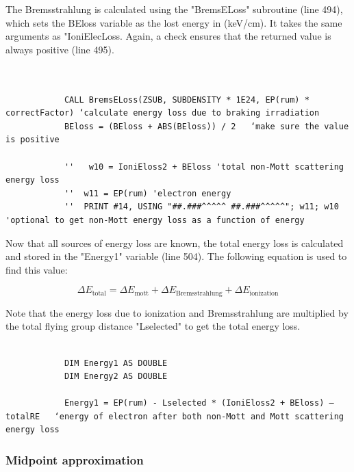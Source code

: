 \documentclass[10pt, reqno]{exam}
\begin{document}
The Bremsstrahlung is calculated using the "BremsELoss" subroutine (line 494), which sets the BEloss variable as the lost energy in (\si{keV/cm}). It takes the same arguments as "IoniElecLoss. Again, a check ensures that the returned value is always positive (line 495). \par

\begin{verbatim}

    
            CALL BremsELoss(ZSUB, SUBDENSITY * 1E24, EP(rum) * correctFactor) ‘calculate energy loss due to braking irradiation 
            BEloss = (BEloss + ABS(BEloss)) / 2   ‘make sure the value is positive
    
            ''   w10 = IoniEloss2 + BEloss 'total non-Mott scattering energy loss
            ''  w11 = EP(rum) 'electron energy 
            ''  PRINT #14, USING "##.###^^^^^ ##.###^^^^^"; w11; w10 'optional to get non-Mott energy loss as a function of energy
\end{verbatim}

Now that all sources of energy loss are known, the total energy loss is calculated and stored in the "Energy1" variable (line 504). The following equation is used to find this value: \par

\begin{equation}
    \Delta E_{\text{total}} = \Delta E_{\text{mott}} + \Delta E_{\text{Bremsstrahlung}} + \Delta E_{\text{ionization}}
\end{equation}

Note that the energy loss due to ionization and Bremsstrahlung are multiplied by the total flying group distance "Lselected" to get the total energy loss. \par

\begin{verbatim}

            DIM Energy1 AS DOUBLE
            DIM Energy2 AS DOUBLE
    
            Energy1 = EP(rum) - Lselected * (IoniEloss2 + BEloss) – totalRE   ‘energy of electron after both non-Mott and Mott scattering energy loss
\end{verbatim}

\subsubsection{Midpoint approximation}
\label{sec:midpoint}
\end{document}
